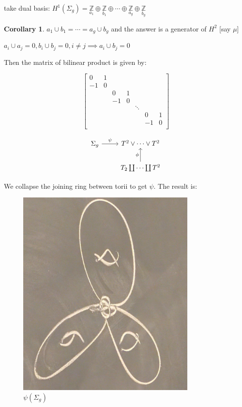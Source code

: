 \documentclass{article}
\theoremstyle{definition}
\newtheorem{corollary}[theorem]{Corollary}
\begin{document}
    take dual basis: \(H^1(\Sigma_g) = \underset{a_1}{\mathbb{Z}} \oplus \underset{b_1}{\mathbb{Z}} \oplus \cdots \oplus \underset{a_g}{\mathbb{Z}} \oplus \underset{b_g}{\mathbb{Z}}\)

    \begin{corollary}
        \(a_1 \cup b_1 = \cdots = a_g\cup b_g\) and the answer is a generator of \(H^2\) [say \(\mu\)]

        \(a_i \cup a_j = 0, b_i \cup b_j = 0, i\neq j \implies a_i \cup b_j = 0\) 
    \end{corollary}

    Then the matrix of bilinear product is given by:

    \[
        \begin{bmatrix}
            0 & 1 &  &  &  &  &  \\
            -1 & 0 &  &  &  &  &  \\
             &  & 0 & 1 &  &  &  \\
             &  & -1 & 0 &  &  &  \\
             &  &  &  & \ddots &  &  \\
             &  &  &  &  & 0 & 1 \\
             &  &  &  &  & -1 & 0 \\
        \end{bmatrix} 
    \]

    \[
        \begin{tikzcd}
            \Sigma_g \ar[r,"\psi"] & T^2 \vee \cdots \vee T^2 \\ & T_2 \coprod \cdots \coprod T^2 \ar[u,"\phi"]
        \end{tikzcd}
    \]

    We collapse the joining ring between torii to get \(\psi\). The result is:

    \begin{figure}[H]
        \centering
        \includegraphics[width=0.8\textwidth]{img/collapsed}
        \caption{\(\psi(\Sigma_g)\)}
    \end{figure}
\end{document}

